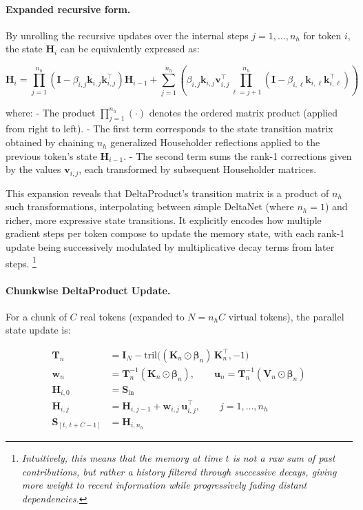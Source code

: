 \documentclass[10pt,a4paper]{article}
\begin{document}
\paragraph{Expanded recursive form.}

By unrolling the recursive updates over the internal steps \(j = 1, \ldots, n_h\) for token \(i\), the state \(\mathbf{H}_i\) can be equivalently expressed as:

\begin{equation}
\mathbf{H}_i = \prod_{j=1}^{n_h} \left(\mathbf{I} - \beta_{i,j} \mathbf{k}_{i,j} \mathbf{k}_{i,j}^\top \right) \mathbf{H}_{i-1} 
+ \sum_{j=1}^{n_h} \left( \beta_{i,j} \mathbf{k}_{i,j} \mathbf{v}_{i,j}^\top \prod_{\ell = j+1}^{n_h} \left(\mathbf{I} - \beta_{i,\ell} \mathbf{k}_{i,\ell} \mathbf{k}_{i,\ell}^\top \right) \right)
\end{equation}

where:
- The product \(\prod_{j=1}^{n_h} (\cdot)\) denotes the ordered matrix product (applied from right to left).
- The first term corresponds to the state transition matrix obtained by chaining \(n_h\) generalized Householder reflections applied to the previous token’s state \(\mathbf{H}_{i-1}\).
- The second term sums the rank-1 corrections given by the values \(\mathbf{v}_{i,j}\), each transformed by subsequent Householder matrices.
  
This expansion reveals that DeltaProduct’s transition matrix is a product of $n_h$ such transformations, interpolating between simple DeltaNet (where $n_h=1$) and richer, more expressive state transitions. It explicitly encodes how multiple gradient steps per token compose to update the memory state, with each rank-1 update being successively modulated by multiplicative decay terms from later steps. \footnote{\textit{Intuitively, this means that the memory at time $t$ is not a raw sum of past contributions, but rather a history filtered through successive decays, giving more weight to recent information while progressively fading distant dependencies.}}

\paragraph{Chunkwise DeltaProduct Update.}

For a chunk of $C$ real tokens (expanded to $N = n_h C$ virtual tokens), the parallel state update is:

\begin{align}
    \mathbf{T}_n &= \mathbf{I}_N - \mathrm{tril}\!\Big( (\mathbf{K}_n \odot \boldsymbol{\beta}_n)\,\mathbf{K}_n^\top , -1 \Big) \\[4pt]
    \mathbf{w}_n &= \mathbf{T}_n^{-1} (\mathbf{K}_n \odot \boldsymbol{\beta}_n), 
    \qquad
    \mathbf{u}_n = \mathbf{T}_n^{-1} (\mathbf{V}_n \odot \boldsymbol{\beta}_n) \\[6pt]
    \mathbf{H}_{i,0} &= \mathbf{S}_{\mathrm{in}} \\[4pt]
    \mathbf{H}_{i,j} &= \mathbf{H}_{i,j-1} + \mathbf{w}_{i,j}\,\mathbf{u}_{i,j}^\top,
    \qquad j=1,\ldots,n_h \\[4pt]
    \mathbf{S}_{[t,\,t+C-1]} &= \mathbf{H}_{i,n_h}
    \label{eq:chunk-deltaproduct}
\end{align}
\end{document}
